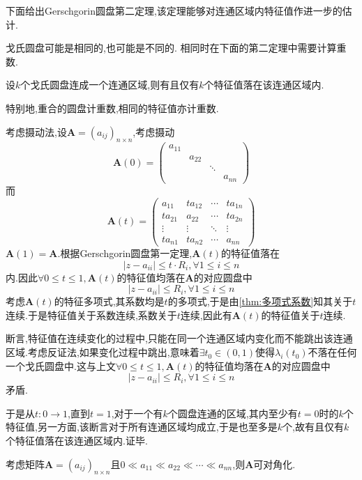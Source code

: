 下面给出Gerschgorin圆盘第二定理,该定理能够对连通区域内特征值作进一步的估计.
\begin{red}
    \begin{remark}
        戈氏圆盘可能是相同的,也可能是不同的.
        相同时在下面的第二定理中需要计算重数.
    \end{remark}
\end{red}
\begin{formal}
\begin{theorem}[Gerschgorin圆盘第二定理]\label{thm:Gerschgorin圆盘第二定理}
    设$k$个戈氏圆盘连成一个连通区域,则有且仅有$k$个特征值落在该连通区域内.

    特别地,重合的圆盘计重数,相同的特征值亦计重数.
\end{theorem}
\begin{Proof}
考虑摄动法,设$\bm{A}=\left(a_{ij}\right)_{n\times n}$,考虑摄动
\[
\bm{A}\left(0\right)=\begin{pmatrix}
    a_{11}&&&\\
    &a_{22}&&\\
    &&\ddots&\\
    &&&a_{nn}
\end{pmatrix}
\]而
\[
\bm{A}\left(t\right)=\begin{pmatrix}
    a_{11}&ta_{12}&\cdots&ta_{1n}\\
    ta_{21}&a_{22}&\cdots&ta_{2n}\\
    \vdots&\vdots&\ddots&\vdots\\
    ta_{n1}&ta_{n2}&\cdots&a_{nn}
\end{pmatrix}
\]$\bm{A}\left(1\right)=\bm{A}.$根据\textup{Gerschgorin}圆盘第一定理,$\bm{A}\left(t\right)$的特征值落在
\[
\left|
    z-a_{ii}
\right|\leqslant t\cdot R_i,\forall 
1\leqslant i\leqslant n
\]内.因此$\forall 0\leqslant t\leqslant 1,\bm{A}\left(t\right)$的特征值均落在$\bm{A}$的对应圆盘中
\[
\left|
    z-a_{ii}  
\right|\leqslant
R_i,\forall 1\leqslant i\leqslant n
\]考虑$\bm{A}\left(t\right)$的特征多项式,其系数均是$t$的多项式,于是由\cref{thm:多项式系数}知其关于$t$连续.于是特征值关于系数连续,系数关于$t$连续,因此有$\bm{A}\left(t\right)$的特征值关于$t$连续.

断言,特征值在连续变化的过程中,只能在同一个连通区域内变化而不能跳出该连通区域.考虑反证法,如果变化过程中跳出,意味着$\exists t_0\in \left(0,1\right)$使得$\lambda_i\left(t_0\right)$不落在任何一个戈氏圆盘中.这与上文$\forall 0\leqslant t\leqslant 1,\bm{A}\left(t\right)$的特征值均落在$\bm{A}$的对应圆盘中
\[
\left|
    z-a_{ii}  
\right|\leqslant
R_i,\forall 1\leqslant i\leqslant n
\]矛盾.

于是从$t:0\to 1$,直到$t=1$,对于一个有$k$个圆盘连通的区域,其内至少有$t=0$时的$k$个特征值,另一方面,该断言对于所有连通区域均成立,于是也至多是$k$个,故有且仅有$k$个特征值落在该连通区域内.证毕.
\end{Proof}
\end{formal}
\begin{brown}
\begin{example}
    考虑矩阵$\bm{A}=\left(a_{ij}\right)_{n\times n}$且$0\ll a_{11}\ll a_{22}\ll\cdots\ll a_{nn}$,则$\bm{A}$可对角化.
\end{example}
\end{brown}
\newpage
